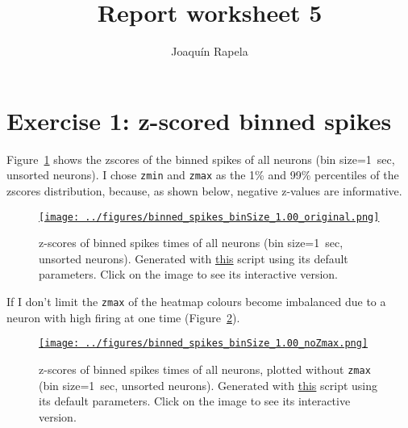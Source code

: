 \documentclass[12pt]{article}
\title{Report worksheet 5}
\author{Joaqu\'{i}n Rapela}
\begin{document}
\maketitle

\section*{Exercise 1: z-scored binned spikes}

Figure~\ref{fig:zscores_unsorted} shows the zscores of the binned spikes of all
neurons (bin size=1~sec, unsorted neurons). I chose \texttt{zmin} and
\texttt{zmax} as the 1\% and 99\% percentiles of the zscores distribution,
because, as shown below, negative z-values are informative.


\begin{figure}[H]
    \begin{center}
        \href{https://www.gatsby.ucl.ac.uk/~rapela/neuroinformatics/2023/ws5/figures/binned_spikes_binSize_1.00_original.html}{\texttt{[image: ../figures/binned\_spikes\_binSize\_1.00\_original.png]}}

        \caption{z-scores of binned spikes times of all neurons (bin
        size=1~sec, unsorted neurons).  Generated with
        \href{https://github.com/joacorapela/neuroinformatics23/blob/master/worksheets/ws5/mySolution/code/scripts/doEx1Plotly.py}{this}
        script using its default parameters. Click on the image to see its
        interactive version.}

        \label{fig:zscores_unsorted}
    \end{center}
\end{figure}

If I don't limit the \texttt{zmax} of the heatmap colours become imbalanced due
to a neuron with high firing at one time
(Figure~\ref{fig:zscores_unsorted_noZmax}). 

\begin{figure}[H]
    \begin{center}
        \href{https://www.gatsby.ucl.ac.uk/~rapela/neuroinformatics/2023/ws5/figures/binned_spikes_binSize_1.00_noZmax.html}{\texttt{[image: ../figures/binned\_spikes\_binSize\_1.00\_noZmax.png]}}

        \caption{z-scores of binned spikes times of all neurons, plotted
        without \texttt{zmax} (bin size=1~sec, unsorted neurons). Generated
        with
        \href{https://github.com/joacorapela/neuroinformatics23/blob/master/worksheets/ws5/mySolution/code/scripts/doEx1Plotly.py}{this}
        script using its default parameters. Click on the image to see its
        interactive version.}

        \label{fig:zscores_unsorted_noZmax}
    \end{center}
\end{figure}
\end{document}
